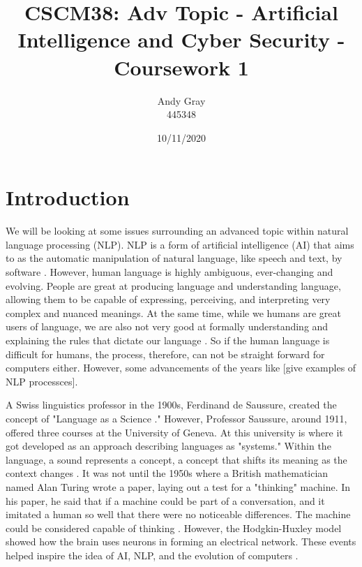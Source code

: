 \documentclass[a4paper,10pt]{article}
\begin{document}
\title{CSCM38: Adv Topic - Artificial Intelligence and Cyber Security - Coursework 1}
\author{Andy Gray\\445348}
\date{10/11/2020}

\maketitle

\section{Introduction}
\label{sec:intro}
	We will be looking at some issues surrounding an advanced topic within natural language processing (NLP).  NLP is a form of artificial intelligence  (AI) that aims to as the automatic manipulation of natural language, like speech and text, by software \cite{nlp_definition}. However, human language is highly ambiguous, ever-changing and evolving. People are great at producing language and understanding language, allowing them to be capable of expressing, perceiving, and interpreting very complex and nuanced meanings. At the same time, while we humans are great users of language, we are also not very good at formally understanding and explaining the rules that dictate our language \cite{goldberg2017neural}. So if the human language is difficult for humans, the process, therefore, can not be straight forward for computers either. However, some advancements of the years like [give examples of NLP processces]. 
	
	A Swiss linguistics professor in the 1900s, Ferdinand de Saussure, created the concept of "Language as a Science \cite{koerner2013ferdinand}." However, Professor Saussure, around 1911, offered three courses at the University of Geneva. At this university is where it got developed as an approach describing languages as "systems." Within the language, a sound represents a concept, a concept that shifts its meaning as the context changes \cite{nlp_history}. It was not until the 1950s where a British mathematician named Alan Turing wrote a paper, laying out a test for a "thinking" machine. In his paper, he said that if a machine could be part of a conversation, and it imitated a human so well that there were no noticeable differences. The machine could be considered capable of thinking \cite{turing2004can}. However, the Hodgkin-Huxley model showed how the brain uses neurons in forming an electrical network. These events helped inspire the idea of AI, NLP, and the evolution of computers \cite{nlp_history}.
	
\end{document}
